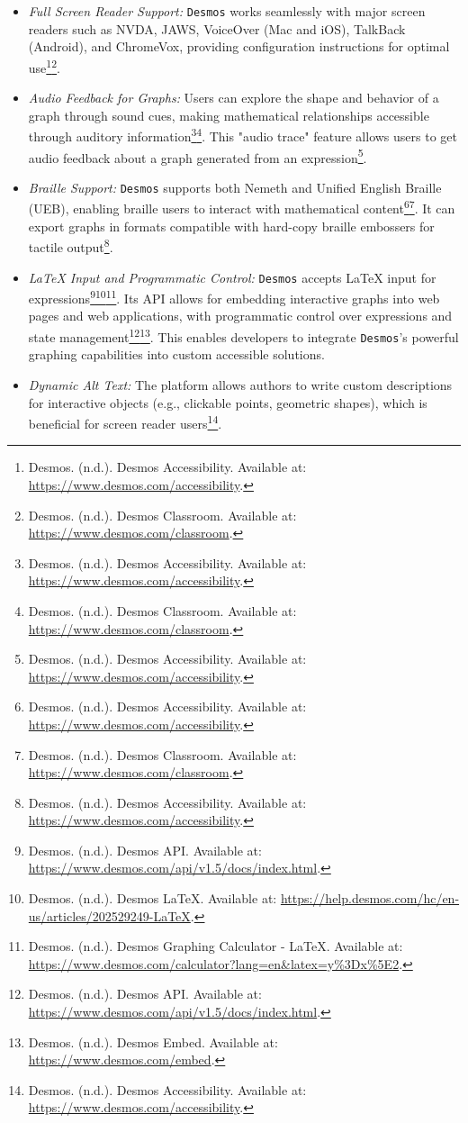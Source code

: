\begin{itemize}
    \item \emph{Full Screen Reader Support:} \texttt{Desmos} works seamlessly with major screen readers such as NVDA, JAWS, VoiceOver (Mac and iOS), TalkBack (Android), and ChromeVox, providing configuration instructions for optimal use\footnote{Desmos. (n.d.). Desmos Accessibility. Available at: \url{https://www.desmos.com/accessibility}.}\footnote{Desmos. (n.d.). Desmos Classroom. Available at: \url{https://www.desmos.com/classroom}.}.
    \item \emph{Audio Feedback for Graphs:} Users can explore the shape and behavior of a graph through sound cues, making mathematical relationships accessible through auditory information\footnote{Desmos. (n.d.). Desmos Accessibility. Available at: \url{https://www.desmos.com/accessibility}.}\footnote{Desmos. (n.d.). Desmos Classroom. Available at: \url{https://www.desmos.com/classroom}.}. This "audio trace" feature allows users to get audio feedback about a graph generated from an expression\footnote{Desmos. (n.d.). Desmos Accessibility. Available at: \url{https://www.desmos.com/accessibility}.}.
    \item \emph{Braille Support:} \texttt{Desmos} supports both Nemeth and Unified English Braille (UEB), enabling braille users to interact with mathematical content\footnote{Desmos. (n.d.). Desmos Accessibility. Available at: \url{https://www.desmos.com/accessibility}.}\footnote{Desmos. (n.d.). Desmos Classroom. Available at: \url{https://www.desmos.com/classroom}.}. It can export graphs in formats compatible with hard-copy braille embossers for tactile output\footnote{Desmos. (n.d.). Desmos Accessibility. Available at: \url{https://www.desmos.com/accessibility}.}.
    \item \emph{LaTeX Input and Programmatic Control:} \texttt{Desmos} accepts LaTeX input for expressions\footnote{Desmos. (n.d.). Desmos API. Available at: \url{https://www.desmos.com/api/v1.5/docs/index.html}.}\footnote{Desmos. (n.d.). Desmos LaTeX. Available at: \url{https://help.desmos.com/hc/en-us/articles/202529249-LaTeX}.}\footnote{Desmos. (n.d.). Desmos Graphing Calculator - LaTeX. Available at: \url{https://www.desmos.com/calculator?lang=en&latex=y%3Dx%5E2}.}. Its API allows for embedding interactive graphs into web pages and web applications, with programmatic control over expressions and state management\footnote{Desmos. (n.d.). Desmos API. Available at: \url{https://www.desmos.com/api/v1.5/docs/index.html}.}\footnote{Desmos. (n.d.). Desmos Embed. Available at: \url{https://www.desmos.com/embed}.}. This enables developers to integrate \texttt{Desmos}'s powerful graphing capabilities into custom accessible solutions.
    \item \emph{Dynamic Alt Text:} The platform allows authors to write custom descriptions for interactive objects (e.g., clickable points, geometric shapes), which is beneficial for screen reader users\footnote{Desmos. (n.d.). Desmos Accessibility. Available at: \url{https://www.desmos.com/accessibility}.}.
\end{itemize}
